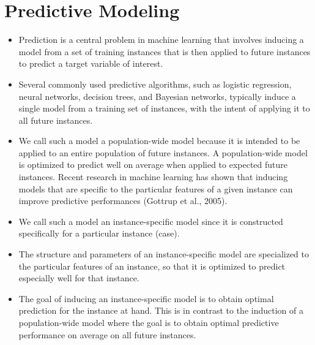 \documentclass[caret-main.tex]{subfiles}
\begin{document}
\section{Predictive Modeling}


\begin{itemize}
\item Prediction is a central problem in machine learning that involves inducing a model from a set of
training instances that is then applied to future instances to predict a target variable of interest.
\item Several commonly used predictive algorithms, such as logistic regression, neural networks, decision
trees, and Bayesian networks, typically induce a single model from a training set of instances, with
the intent of applying it to all future instances. 


\item We call such a model a population-wide model because it is intended to be applied to an entire population of future instances. A population-wide
model is optimized to predict well on average when applied to expected future instances.
Recent research in machine learning has shown that inducing models that are speciﬁc to the
particular features of a given instance can improve predictive performances (Gottrup et al., 2005).
\item We call such a model an instance-speciﬁc model since it is constructed speciﬁcally for a particular
instance (case). 

\item The structure and parameters of an instance-speciﬁc model are specialized to the
particular features of an instance, so that it is optimized to predict especially well for that instance.
\item The goal of inducing an instance-speciﬁc model is to obtain optimal prediction for the instance at
hand. This is in contrast to the induction of a population-wide model where the goal is to obtain
optimal predictive performance on average on all future instances.
\end{itemize}


\end{document}
